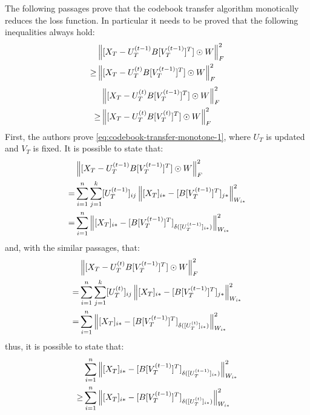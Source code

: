 \vskip 0.7cm
The following passages prove that the codebook transfer algorithm monotically reduces the loss function. In particular it needs to be proved that the following inequalities always hold:
\begin{equation}
\label{eq:codebook-transfer-monotone-1}
\begin{split}
& \left\lVert[X_T - U_T^{(t - 1)} B [V_T^{(t - 1)}]^T] \odot W\right\rVert_F^2 \\
\geq & \left\lVert[X_T - U_T^{(t)} B [V_T^{(t - 1)}]^T] \odot W\right\rVert_F^2
\end{split}
\end{equation}
\begin{equation}
\label{eq:codebook-transfer-monotone-2}
\begin{split}
& \left\lVert[X_T - U_T^{(t)} B [V_T^{(t - 1)}]^T] \odot W\right\rVert_F^2 \\
\geq & \left\lVert[X_T - U_T^{(t)} B [V_T^{(t)}]^T] \odot W\right\rVert_F^2
\end{split}
\end{equation}
First, the authors prove \autoref{eq:codebook-transfer-monotone-1}, where $U_T$ is updated and $V_T$ is fixed. It is possible to state that:
\begin{equation}
\label{eq:codebook-transfer-monotone-3}
\begin{split}
& \left\lVert[X_T - U_T^{(t - 1)} B [V_T^{(t - 1)}]^T] \odot W\right\rVert_F^2 \\
= & \sum_{i = 1}^{n} \sum_{j = 1}^{k} [U_T^{(t - 1)}]_{ij} \left\lVert[X_T]_{i*} - [B [V_T^{(t - 1)}]^T]_{j*}\right\rVert_{W_{i*}}^2 \\
= & \sum_{i = 1}^{n} \left\lVert[X_T]_{i*} - [B [V_T^{(t - 1)}]^T]_{\delta([U_T^{(t - 1)}]_{i*})}\right\rVert_{W_{i*}}^2
\end{split}
\end{equation}
and, with the similar passages, that:
\begin{equation}
\begin{split}
& \left\lVert[X_T - U_T^{(t)} B [V_T^{(t - 1)}]^T] \odot W\right\rVert_F^2 \\
= & \sum_{i = 1}^{n} \sum_{j = 1}^{k} [U_T^{(t)}]_{ij} \left\lVert[X_T]_{i*} - [B [V_T^{(t - 1)}]^T]_{j*}\right\rVert_{W_{i*}}^2 \\
= & \sum_{i = 1}^{n} \left\lVert[X_T]_{i*} - [B [V_T^{(t - 1)}]^T]_{\delta([U_T^{(t)}]_{i*})}\right\rVert_{W_{i*}}^2
\end{split}
\end{equation}
thus, it is possible to state that:
\begin{equation}
\begin{split}
& \sum_{i = 1}^{n} \left\lVert[X_T]_{i*} - [B [V_T^{(t - 1)}]^T]_{\delta([U_T^{(t - 1)}]_{i*})}\right\rVert_{W_{i*}}^2 \\
\geq & \sum_{i = 1}^{n} \left\lVert[X_T]_{i*} - [B [V_T^{(t - 1)}]^T]_{\delta([U_T^{(t)}]_{i*})}\right\rVert_{W_{i*}}^2
\end{split}
\end{equation}
